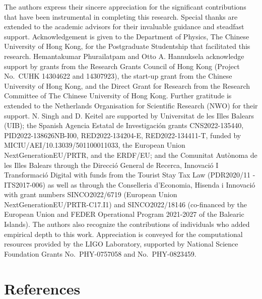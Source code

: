 \documentclass[10pt,a4paper,onecolumn]{article}
\let\textttOrig=\texttt
\def\texttt#1{\expandafter\textttOrig{\seqsplit{#1}}}
\let\addcontentslineOrig=\addcontentsline
\def\addcontentsline#1#2#3{\bgroup
  \let\texttt=\textttOrig\addcontentslineOrig{#1}{#2}{#3}\egroup}
\begin{document}
The authors express their sincere appreciation for the significant
contributions that have been instrumental in completing this research.
Special thanks are extended to the academic advisors for their
invaluable guidance and steadfast support. Acknowledgement is given to
the Department of Physics, The Chinese University of Hong Kong, for the
Postgraduate Studentship that facilitated this research. Hemantakumar
Phurailatpam and Otto A. Hannuksela acknowledge support by grants from
the Research Grants Council of Hong Kong (Project No.~CUHK 14304622 and
14307923), the start-up grant from the Chinese University of Hong Kong,
and the Direct Grant for Research from the Research Committee of The
Chinese University of Hong Kong. Further gratitude is extended to the
Netherlands Organisation for Scientific Research (NWO) for their
support. N. Singh and D. Keitel are supported by Universitat de les
Illes Balears (UIB); the Spanish Agencia Estatal de Investigación grants
CNS2022-135440, PID2022-138626NB-I00, RED2022-134204-E,
RED2022-134411-T, funded by MICIU/AEI/10.13039/501100011033, the
European Union NextGenerationEU/PRTR, and the ERDF/EU; and the Comunitat
Autònoma de les Illes Balears through the Direcció General de Recerca,
Innovació I Transformació Digital with funds from the Tourist Stay Tax
Law (PDR2020/11 - ITS2017-006) as well as through the Conselleria
d'Economia, Hisenda i Innovació with grant numbers SINCO2022/6719
(European Union NextGenerationEU/PRTR-C17.I1) and SINCO2022/18146
(co-financed by the European Union and FEDER Operational Program
2021-2027 of the Balearic Islands). The authors also recognize the
contributions of individuals who added empirical depth to this work.
Appreciation is conveyed for the computational resources provided by the
LIGO Laboratory, supported by National Science Foundation Grants
No.~PHY-0757058 and No.~PHY-0823459.

\section*{References}\label{references}
\end{document}
